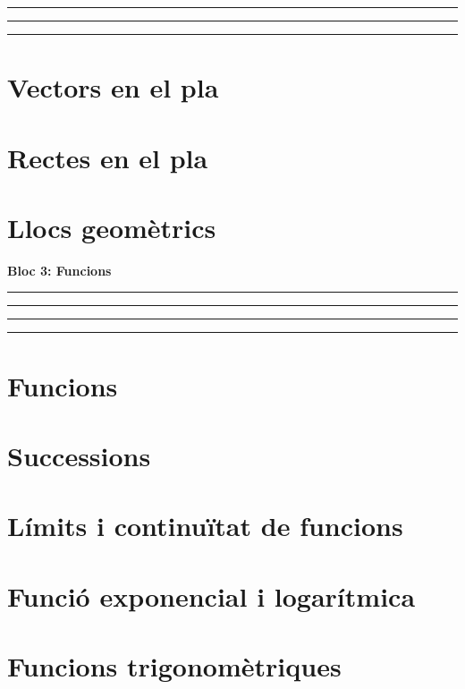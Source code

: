 \documentclass[]{article}
\begin{document}
\begin{center}\rule{0.5\linewidth}{\linethickness}\end{center}

\begin{center}\rule{0.5\linewidth}{\linethickness}\end{center}

\begin{center}\rule{0.5\linewidth}{\linethickness}\end{center}

\section{Vectors en el pla}\label{vectors-en-el-pla}

\section{Rectes en el pla}\label{rectes-en-el-pla}

\section{Llocs geomètrics}\label{llocs-geomuxe8trics}

\textbf{Bloc 3: Funcions}

\begin{center}\rule{0.5\linewidth}{\linethickness}\end{center}

\begin{center}\rule{0.5\linewidth}{\linethickness}\end{center}

\begin{center}\rule{0.5\linewidth}{\linethickness}\end{center}

\begin{center}\rule{0.5\linewidth}{\linethickness}\end{center}

\section{Funcions}\label{funcions}

\section{Successions}\label{successions}

\section{Límits i continuïtat de
funcions}\label{luxedmits-i-continuuxeftat-de-funcions}

\section{Funció exponencial i
logarítmica}\label{funciuxf3-exponencial-i-logaruxedtmica}

\section{Funcions trigonomètriques}\label{funcions-trigonomuxe8triques}
\end{document}
